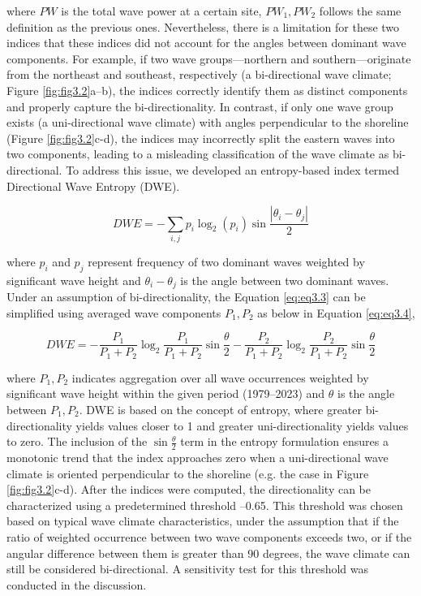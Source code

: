 where $PW$ is the total wave power at a certain site, $PW_1, PW_2$ follows the
same definition as the previous ones. Nevertheless, there is a limitation for
these two indices that these indices did not account for the angles between
dominant wave components. For example, if two wave groups—northern and
southern—originate from the northeast and southeast, respectively (a
bi-directional wave climate; Figure \ref{fig:fig3.2}a–b), the indices correctly
identify them as distinct components and properly capture the bi-directionality.
In contrast, if only one wave group exists (a uni-directional wave climate) with
angles perpendicular to the shoreline (Figure \ref{fig:fig3.2}c-d), the indices
may incorrectly split the eastern waves into two components, leading to a
misleading classification of the wave climate as bi-directional. To address this
issue, we developed an entropy-based index termed Directional Wave Entropy
(DWE). 

\begin{equation}
DWE = -\sum_{i,j}p_i\log_2(p_i)\sin{\frac{|\theta_i - \theta_j|}{2}}
\label{eq:eq3.3}
\end{equation}

where $p_i$ and $p_j$ represent frequency of two dominant waves weighted by
significant wave height and $\theta_i-\theta_j$ is the angle between two
dominant waves. Under an assumption of bi-directionality, the Equation
\ref{eq:eq3.3} can be simplified using averaged wave components $P_1,P_2$ as
below in Equation \ref{eq:eq3.4},

\begin{equation}
    DWE = - \frac{P_1}{P_1+P_2}\log_2\frac{P_1}{P_1+P_2}\sin{\frac{\theta}{2}}- \frac{P_2}{P_1+P_2}\log_2\frac{P_2}{P_1+P_2}\sin{\frac{\theta}{2}}
\label{eq:eq3.4}
\end{equation}

where $P_1, P_2$ indicates aggregation over all wave occurrences weighted by
significant wave height within the given period (1979–2023) and $\theta$ is the
angle between $P_1, P_2$. DWE is based on the concept of entropy, where greater
bi-directionality yields values closer to 1 and greater uni-directionality
yields values to zero. The inclusion of the $\sin{\frac{\theta}{2}}$ term in the
entropy formulation ensures a monotonic trend that the index approaches zero
when a uni-directional wave climate is oriented perpendicular to the shoreline
(e.g. the case in  Figure \ref{fig:fig3.2}c-d). After the indices were
computed, the directionality can be characterized using a predetermined
threshold –0.65. This threshold was chosen based on typical wave climate
characteristics, under the assumption that if the ratio of weighted occurrence
between two wave components exceeds two, or if the angular difference between
them is greater than 90 degrees, the wave climate can still be considered
bi-directional. A sensitivity test for this threshold was conducted in the
discussion.

